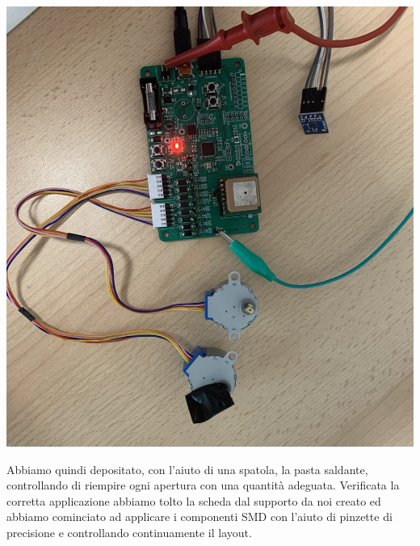\begin{center}
\includegraphics[scale=0.4]{figures/image101.png}
\captionsetup{type=figure}
\end{center}

\noindent Abbiamo quindi depositato, con l’aiuto di una spatola, la pasta saldante, 
controllando di riempire ogni apertura con una quantità adeguata. Verificata la 
corretta applicazione abbiamo tolto la scheda dal supporto da noi creato ed abbiamo 
cominciato ad applicare i componenti SMD con l’aiuto di pinzette di precisione e controllando 
continuamente il layout.

